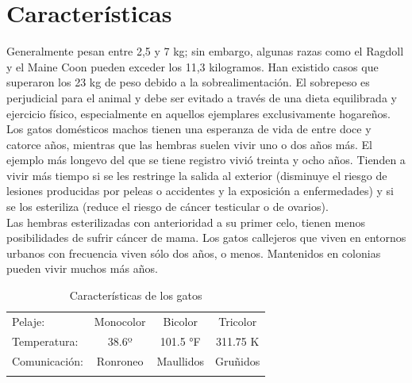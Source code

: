 \documentclass[a4paper]{article}
\begin{document}
\pagebreak




\section{Características}

Generalmente pesan entre 2,5 y 7 kg; sin embargo, algunas razas como el Ragdoll y el Maine Coon pueden exceder los 11,3 kilogramos. Han existido casos que superaron los 23 kg de peso debido a la sobrealimentación. El sobrepeso es perjudicial para el animal y debe ser evitado a través de una dieta equilibrada y ejercicio físico, especialmente en aquellos ejemplares exclusivamente hogareños.\\


Los gatos domésticos machos tienen una esperanza de vida de entre doce y catorce años, mientras que las hembras suelen vivir uno o dos años más. El ejemplo más longevo del que se tiene registro vivió treinta y ocho años. Tienden a vivir más tiempo si se les restringe la salida al exterior (disminuye el riesgo de lesiones producidas por peleas o accidentes y la exposición a enfermedades) y si se los esteriliza (reduce el riesgo de cáncer testicular o de ovarios). \\


Las hembras esterilizadas con anterioridad a su primer celo, tienen menos posibilidades de sufrir cáncer de mama. Los gatos callejeros que viven en entornos urbanos con frecuencia viven sólo dos años, o menos. Mantenidos en colonias pueden vivir muchos más años.
\\


\begin{table}[htbp]
\center
\caption{Características de los gatos}
\begin{tabular}{lccc}
\hline
Pelaje: & Monocolor & Bicolor & Tricolor\\
Temperatura: & 38.6º & 101.5 °F & 311.75 K\\
Comunicación: & Ronroneo & Maullidos & Gruñidos \\
\hline
\label{tabla1}
\end{tabular}
\end{table}
\end{document}
